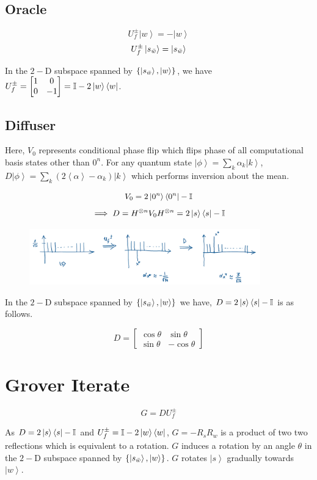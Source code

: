 \documentclass[11.5pt, paper=a4]{article}
\theoremstyle{definition}
\numberwithin{theorem}{section}
\newcommand{\ket}[1]{\ensuremath{\left|#1\right\rangle}}
\begin{document}
\subsection{Oracle}
$$U_f^{\pm}\ket{w} = - \ket{w}$$
$$U_f^{\pm}\ket{s_{\Bar{w}}} = \ket{s_{\Bar{w}}}$$

In the $2-$D subspace spanned by $\{\ket{s_{\Bar{w}}}, \ket{w}\}$, we have $U_f^{\pm} = \begin{bmatrix}1 & 0\\ 0 & -1\end{bmatrix} = \mathbb{I} - 2\ket{w}\bra{w}$.

\subsection{Diffuser}
Here, $V_0$ represents conditional phase flip which flips phase of all computational basis states other than $0^n$. For any quantum state $\ket{\phi} = \sum_k \alpha_k \ket{k}$, $D\ket{\phi} = \sum_k (2\left<\alpha\right> - \alpha_k)\ket{k}$ which performs inversion about the mean.

$$V_0 = 2 \ket{0^n}\bra{0^n} - \mathbb{I}$$
$$\implies D = H^{\otimes n} V_0 H^{\otimes n} = 2 \ket{s}\bra{s} - \mathbb{I}$$

\begin{figure}[H]
    \centering
    \includegraphics[width=100mm]{images/1.png}
\end{figure}

In the $2-$D subspace spanned by $\{\ket{s_{\Bar{w}}}, \ket{w}\}$ we have, $D = 2\ket{s}\bra{s} - \mathbb{I}$ is as follows.

$$D = \begin{bmatrix}\cos \theta & \sin \theta\\ \sin \theta & -\cos \theta\end{bmatrix}$$

\section{Grover Iterate}
$$G = DU_f^{\pm}$$

As $D = 2\ket{s}\bra{s} - \mathbb{I}$ and $U_f^{\pm} = \mathbb{I} - 2 \ket{w}\bra{w}$, $G = - R_s R_w$ is a product of two two reflections which is equivalent to a rotation. $G$ induces a rotation by an angle $\theta$ in the $2-$D subspace spanned by $\{\ket{s_{\Bar{w}}}, \ket{w}\}$. $G$ rotates $\ket{s}$ gradually towards $\ket{w}$.
\end{document}
